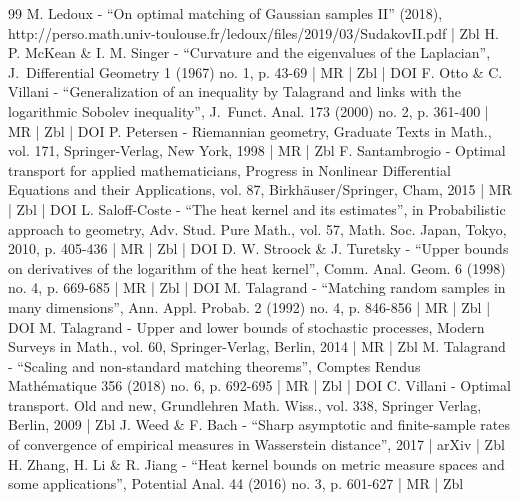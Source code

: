 \begin{thebibliography}{99}
M. Ledoux - “On optimal matching of Gaussian samples II” (2018), http://perso.math.univ-toulouse.fr/ledoux/files/2019/03/SudakovII.pdf | Zbl
H. P. McKean \& I. M. Singer - “Curvature and the eigenvalues of the Laplacian”, J. Differential Geometry 1 (1967) no. 1, p. 43-69 | MR | Zbl | DOI
F. Otto \& C. Villani - “Generalization of an inequality by Talagrand and links with the logarithmic Sobolev inequality”, J. Funct. Anal. 173 (2000) no. 2, p. 361-400 | MR | Zbl | DOI
P. Petersen - Riemannian geometry, Graduate Texts in Math., vol. 171, Springer-Verlag, New York, 1998 | MR | Zbl
F. Santambrogio - Optimal transport for applied mathematicians, Progress in Nonlinear Differential Equations and their Applications, vol. 87, Birkhäuser/Springer, Cham, 2015 | MR | Zbl | DOI
L. Saloff-Coste - “The heat kernel and its estimates”, in Probabilistic approach to geometry, Adv. Stud. Pure Math., vol. 57, Math. Soc. Japan, Tokyo, 2010, p. 405-436 | MR | Zbl | DOI
D. W. Stroock \& J. Turetsky - “Upper bounds on derivatives of the logarithm of the heat kernel”, Comm. Anal. Geom. 6 (1998) no. 4, p. 669-685 | MR | Zbl | DOI
M. Talagrand - “Matching random samples in many dimensions”, Ann. Appl. Probab. 2 (1992) no. 4, p. 846-856 | MR | Zbl | DOI
M. Talagrand - Upper and lower bounds of stochastic processes, Modern Surveys in Math., vol. 60, Springer-Verlag, Berlin, 2014 | MR | Zbl
M. Talagrand - “Scaling and non-standard matching theorems”, Comptes Rendus Mathématique 356 (2018) no. 6, p. 692-695 | MR | Zbl | DOI
C. Villani - Optimal transport. Old and new, Grundlehren Math. Wiss., vol. 338, Springer Verlag, Berlin, 2009 | Zbl
J. Weed \& F. Bach - “Sharp asymptotic and finite-sample rates of convergence of empirical measures in Wasserstein distance”, 2017 | arXiv | Zbl
H. Zhang, H. Li \& R. Jiang - “Heat kernel bounds on metric measure spaces and some applications”, Potential Anal. 44 (2016) no. 3, p. 601-627 | MR | Zbl
\end{thebibliography}
